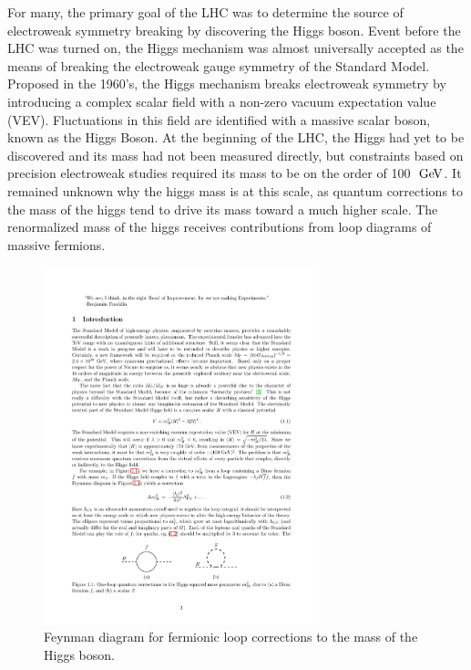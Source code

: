 For many, the primary goal of the LHC was to determine the source of electroweak symmetry breaking by discovering the Higgs boson.
Event before the LHC was turned on, the Higgs mechanism was almost universally accepted
as the means of breaking the electroweak gauge symmetry of the Standard Model.
Proposed in the 1960's, the Higgs mechanism breaks electroweak symmetry by introducing a complex scalar field with a non-zero vacuum expectation value (VEV).
Fluctuations in this field are identified with a massive scalar boson, known as the Higgs Boson.
At the beginning of the LHC, the Higgs had yet to be discovered and its mass had not been measured directly,
but constraints based on precision electroweak studies required its mass to be on the order of 100 $\GeV$.
It remained unknown why the higgs mass is at this scale, as quantum corrections to the mass of the higgs
tend to drive its mass toward a much higher scale. %
The renormalized mass of the higgs receives contributions from loop diagrams of massive fermions.
\begin{figure}
  \begin{center}
    \includegraphics[width=80mm]{figures/theory/HiggsMassCorrection}
  \end{center}
  \caption{Feynman diagram for fermionic loop corrections to the mass of the Higgs boson.}
  \label{img:HiggsMassCorrection}
\end{figure}
